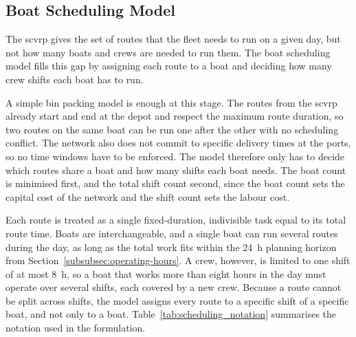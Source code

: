 \documentclass[12pt]{article}
\begin{document}
\subsection{Boat Scheduling Model}
\label{subsubsec:boat-scheduling-optimization-model}

The \ac{scvrp} gives the set of routes that the fleet needs to run on a given day, but not how many boats and crews are needed to run them. The boat scheduling model fills this gap by assigning each route to a boat and deciding how many crew shifts each boat has to run.

A simple bin packing model \parencite{delorme2016bin} is enough at this stage. The routes from the \ac{scvrp} already start and end at the depot and respect the maximum route duration, so two routes on the same boat can be run one after the other with no scheduling conflict. The network also does not commit to specific delivery times at the ports, so no time windows have to be enforced. The model therefore only has to decide which routes share a boat and how many shifts each boat needs. The boat count is minimised first, and the total shift count second, since the boat count sets the capital cost of the network and the shift count sets the labour cost.

Each route is treated as a single fixed-duration, indivisible task equal to its total route time. Boats are interchangeable, and a single boat can run several routes during the day, as long as the total work fits within the \qty{24}{\hour} planning horizon from Section~\ref{subsubsec:operating-hours}. A crew, however, is limited to one shift of at most \qty{8}{\hour}, so a boat that works more than eight hours in the day must operate over several shifts, each covered by a new crew. Because a route cannot be split across shifts, the model assigns every route to a specific shift of a specific boat, and not only to a boat. Table~\ref{tab:scheduling_notation} summarises the notation used in the formulation.
\end{document}
